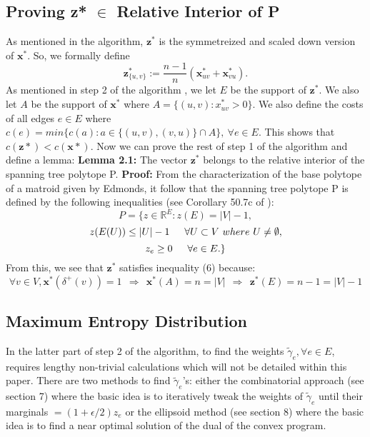 \documentclass[oneside]{projectpaper} %
\begin{document}
\subsection{Proving z* $\in$ Relative Interior of P}
\indent As mentioned in the algorithm, $\textbf{z}^*$ is the symmetreized and scaled down version of $\textbf{x}^*$. So, we formally define
\begin{equation}
 \textbf{z}_{\{u, v\}}^{*} := \frac{n-1}{n}(\textbf{x}_{uv}^* + \textbf{x}_{vu}^*).
\end{equation}
\indent As mentioned in step 2 of the algorithm , we let $E$ be the support of $\textbf{z}^*$. We also let $A$ be the support of $\textbf{x}^*$ where $A = \{(u, v) : x_{uv}^{*} > 0 \}$. We also define the costs of all edges $e \in E$ where $c(e) = min \{c(a) : a \in \{(u, v), (v, u)\} \cap A \}, \ \forall e \in E$. This shows that $c(\textbf{z}*) < c(\textbf{x}*)$. Now we can prove the rest of step 1 of the algorithm and define a lemma:
\newline
\newline
\textbf{Lemma 2.1:} The vector $\textbf{z}^*$ belongs to the relative interior of the spanning tree polytope P.
\newline
\newline
\textbf{Proof:} From the characterization of the base polytope of a matroid given by Edmonds\cite{Edm71}, it follow that the spanning tree polytope P is defined by the following inequalities (see Corollary 50.7c of \cite{Sch03}):
\begin{equation}
P = \{z \in \mathbb{R}^E : z(E) = |V| - 1,
\end{equation}
\begin{equation}
z(E(U)) \leq |U| - 1 \indent \forall U \subset V \ where \ U \neq \emptyset,
\end{equation}
\begin{equation}
z_e \geq 0 \indent \forall e \in E.\}
\end{equation}
From this, we see that $\textbf{z}^*$ satisfies inequality (6) because:
\begin{equation*}
\forall v \in V, \textbf{x}^*(\delta^+(v)) = 1 \ \ \Rightarrow \ \ \textbf{x}^*(A) = n = |V| \ \ \Rightarrow \ \ \textbf{z}^*(E) = n - 1 = |V| - 1
\end{equation*}

\subsection{Maximum Entropy Distribution}
In the latter part of step 2 of the algorithm, to find the weights $\tilde{\gamma}_{e}, \forall e \in E$, requires lengthy non-trivial calculations which will not be detailed within this paper. There are two methods to find $\tilde{\gamma}_{e}$'s: either the combinatorial approach (see \cite{AGM10} section 7) where the basic idea is to iteratively tweak the weights of $\tilde{\gamma}_{e}$ until their marginals $= (1 + \epsilon/2)z_e$ or the ellipsoid method (see \cite{AGM10} section 8) where the basic idea is to find a near optimal solution of the dual of the convex program.
\end{document}
